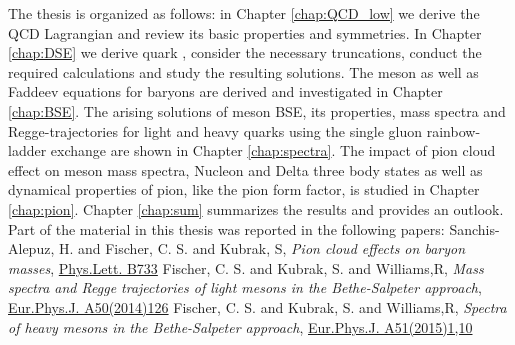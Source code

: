 The thesis is organized as follows: in Chapter \ref{chap:QCD_low} we derive the QCD Lagrangian and review its basic properties and symmetries. In Chapter \ref{chap:DSE} we derive quark \DSE, consider the necessary truncations, conduct the required calculations and study the resulting solutions. The meson \BSE as well as Faddeev equations for baryons are derived and investigated in Chapter \ref{chap:BSE}. The arising solutions of meson BSE, its properties, mass spectra and Regge-trajectories for light and heavy quarks using the single gluon rainbow-ladder exchange are shown in Chapter \ref{chap:spectra}. The impact of pion cloud effect on meson mass spectra, Nucleon and Delta three body states as well as dynamical properties of pion, like the pion form factor, is studied in Chapter \ref{chap:pion}. Chapter \ref{chap:sum} summarizes the results and provides an outlook. \\ 

Part of the material in this thesis was reported in the following papers:
\newline
\newline
Sanchis-Alepuz, H. and Fischer, C. S. and Kubrak, S, \textit{Pion cloud effects on baryon masses}, \href{10.1016/j.physletb.2014.04.031}{{Phys.Lett. B733}} \newline
\newline
Fischer, C. S. and Kubrak, S. and Williams,R, \textit{Mass spectra and Regge trajectories of light mesons in the Bethe-Salpeter approach}, \href{http://10.1140/epja/i2014-14126-6}{{Eur.Phys.J. A50(2014)126}} \newline
\newline
Fischer, C. S. and Kubrak, S. and Williams,R, \textit{Spectra of heavy mesons in the Bethe-Salpeter approach}, \href{http://10.1140/epja/i2015-15010-7}{{Eur.Phys.J. A51(2015)1,10}}
